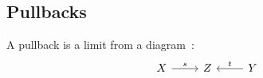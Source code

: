 \subsection{Pullbacks}

\begin{definition}[Pullback]

  A pullback is a limit from a diagram~\parencite[p.~114]{leinster:basic_category_theory}:
  \[\begin{tikzcd}[ampersand replacement=\&]
    X \& Z \& Y
    \arrow["t"', from=1-3, to=1-2]
    \arrow["s", from=1-1, to=1-2]
  \end{tikzcd}\]
\end{definition}